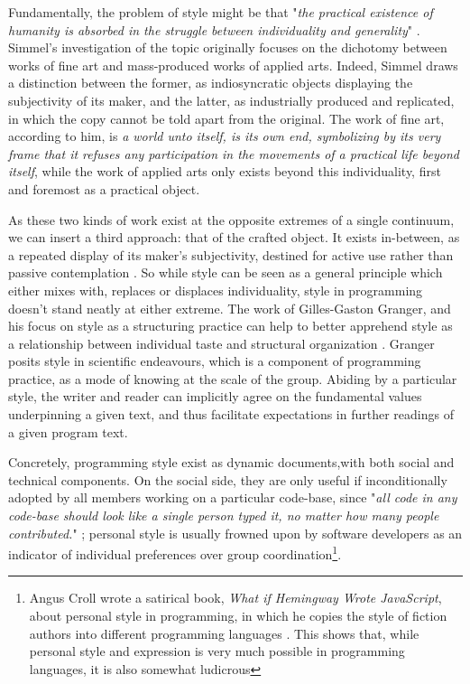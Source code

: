 Fundamentally, the problem of style might be that "\emph{the practical existence of humanity is absorbed in the struggle between individuality and generality}" \citep{simmel_problem_1991}. Simmel's investigation of the topic originally focuses on the dichotomy between works of fine art and mass-produced works of applied arts. Indeed, Simmel draws a distinction between the former, as indiosyncratic objects displaying the subjectivity of its maker, and the latter, as industrially produced and replicated, in which the copy cannot be told apart from the original. The work of fine art, according to him, is \emph{a world unto itself, is its own end, symbolizing by its very frame that it refuses any participation in the movements of a practical life beyond itself}, while the work of applied arts only exists beyond this individuality, first and foremost as a practical object.

As these two kinds of work exist at the opposite extremes of a single continuum, we can insert a third approach: that of the crafted object. It exists in-between, as a repeated display of its maker's subjectivity, destined for active use rather than passive contemplation \citep{sennett_craftsman_2009}. So while style can be seen as a general principle which either mixes with, replaces or displaces individuality, style in programming doesn't stand neatly at either extreme. The work of Gilles-Gaston Granger, and his focus on style as a structuring practice can help to better apprehend style as a relationship between individual taste and structural organization \citep{granger_essai_1988}. Granger posits style in scientific endeavours, which is a component of programming practice, as a mode of knowing at the scale of the group. Abiding by a particular style, the writer and reader can implicitly agree on the fundamental values underpinning a given text, and thus facilitate expectations in further readings of a given program text.

Concretely, programming style exist as dynamic documents,with both social and technical components. On the social side, they are only useful if inconditionally adopted by all members working on a particular code-base, since "\emph{all code in any code-base should look like a single person typed it, no matter how many people contributed.}" \citep{waldron_idiomatic_2020}; personal style is usually frowned upon by software developers as an indicator of individual preferences over group coordination\footnote{Angus Croll wrote a satirical book, \emph{What if Hemingway Wrote JavaScript}, about personal style in programming, in which he copies the style of fiction authors into different programming languages \citep{croll_if_2014}. This shows that, while personal style and expression is very much possible in programming languages, it is also somewhat ludicrous}.

